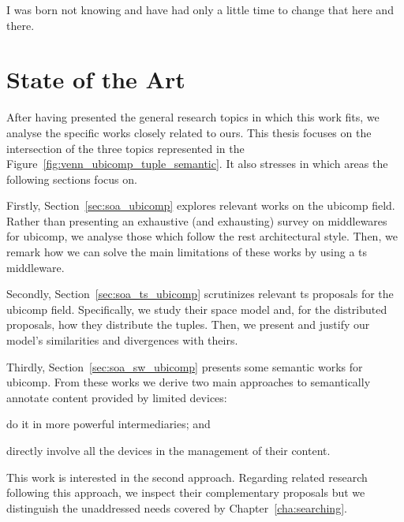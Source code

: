 
\begin{savequote}[50mm]
I was born not knowing and have had only a little time to change that here and there.
\end{savequote}


\chapter{State of the Art}
\label{cha:stateoftheart}

\ifpdf
    \graphicspath{{\pathchapthree/figures/PNG/}{\pathchapthree/figures/PDF/}{\pathchapthree/figures/}}
\else
    \graphicspath{{\pathchapthree/figures/EPS/}{\pathchapthree/figures/}}
\fi



After having presented the general research topics in which this work fits, we analyse the specific works closely related to ours.
This thesis focuses on the intersection of the three topics represented in the Figure~\ref{fig:venn_ubicomp_tuple_semantic}. %
It also stresses in which areas the following sections focus on.


Firstly, Section~\ref{sec:soa_ubicomp} explores relevant works on the \ac{ubicomp} field.
Rather than presenting an exhaustive (and exhausting) survey on middlewares for \ac{ubicomp},
we analyse those which follow the \ac{rest} architectural style.
Then, we remark how we can solve the main limitations of these works by using a \ac{ts} middleware.


Secondly, Section~\ref{sec:soa_ts_ubicomp} scrutinizes relevant \ac{ts} proposals for the \ac{ubicomp} field.
Specifically, we study their space model and, for the distributed proposals, how they distribute the tuples.
Then, we present and justify our model's similarities and divergences with theirs.


Thirdly, Section~\ref{sec:soa_sw_ubicomp} presents some semantic works for \ac{ubicomp}.
From these works we derive two main approaches to semantically annotate content provided by limited devices:
\begin{enumerate*}[label=\itshape\alph*\upshape)]
  \item do it in more powerful intermediaries; and
  \item directly involve all the devices in the management of their content.
\end{enumerate*}
This work is interested in the second approach.
Regarding related research following this approach, we inspect their complementary proposals but we distinguish the unaddressed needs covered by Chapter~\ref{cha:searching}. %


